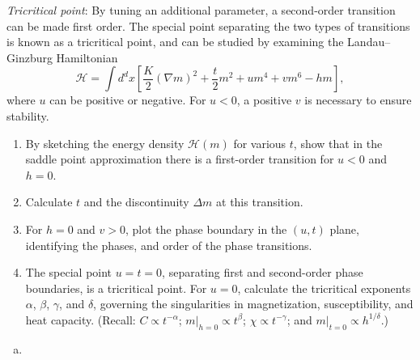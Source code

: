 \begin{problem}
    \textit{Tricritical point}: By tuning an additional parameter, a second-order transition can be made first order. The special point separating the two types of transitions is known as a tricritical point, and can be studied by examining the Landau--Ginzburg Hamiltonian
    \[
        \mathcal{H} = \int d^dx\left[\frac{K}{2}(\nabla m)^2 + \frac{t}{2}m^2 + um^4 + vm^6 - hm\right],
    \]
    where $u$ can be positive or negative. For $u < 0$, a positive $v$ is necessary to ensure stability.

    \begin{enumerate}
        \item[(a)] By sketching the energy density $\mathcal{H}(m)$ for various $t$, show that in the saddle point approximation there is a first-order transition for $u < 0$ and $h = 0$.

        \item[(b)] Calculate $t$ and the discontinuity $\Delta m$ at this transition.

        \item[(c)] For $h = 0$ and $v > 0$, plot the phase boundary in the $(u,t)$ plane, identifying the phases, and order of the phase transitions.

        \item[(d)] The special point $u = t = 0$, separating first and second-order phase boundaries, is a tricritical point. For $u = 0$, calculate the tricritical exponents $\alpha$, $\beta$, $\gamma$, and $\delta$, governing the singularities in magnetization, susceptibility, and heat capacity. (Recall: $C \propto t^{-\alpha}$; $m|_{h=0} \propto t^\beta$; $\chi \propto t^{-\gamma}$; and $m|_{t=0} \propto h^{1/\delta}$.)
    \end{enumerate}
\end{problem}

\begin{solution}
    \begin{enumerate}[(a)]
        \item
    \end{enumerate}
\end{solution}

